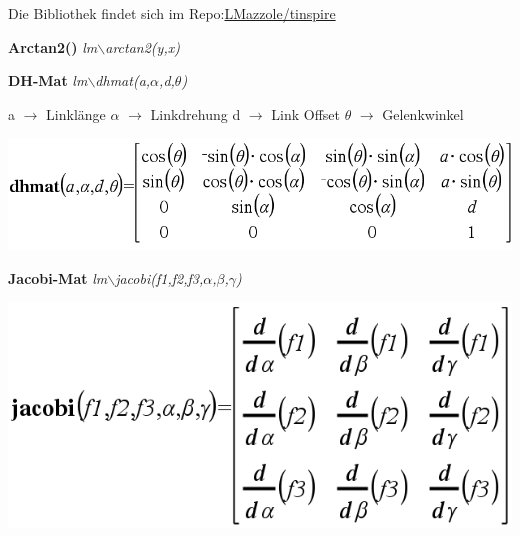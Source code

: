 \begin{minipage}{0.6\linewidth}
    \vspace{-1cm}
    Die Bibliothek findet sich im Repo:\newline \href{https://github.com/LMazzole/tinspire}{LMazzole/tinspire}
    
    \hrulefill
    
    \textbf{Arctan2()} \hfill \textit{lm$\backslash$arctan2(y,x)} \hspace{4.5cm}
    
    \hrulefill
    
    \textbf{DH-Mat}\hfill 
    \textit{lm$\backslash$dhmat(a,$\alpha$,d,$\theta$)} \hspace{4cm}
    \begin{multicols}{2}
        a $\rightarrow$ Linklänge \newline
        $\alpha$ $\rightarrow$ Linkdrehung\newline
        d $\rightarrow$ Link Offset\newline
        $\theta$ $\rightarrow$ Gelenkwinkel
    \end{multicols}
    \begin{center}
        \includegraphics[width=0.7\linewidth]{./bilder/dhmat}
    \end{center} \vspace{-\baselineskip}
    \hrulefill
    
    \textbf{Jacobi-Mat} \hfill \textit{lm$\backslash$jacobi(f1,f2,f3,$\alpha$,$\beta$,$\gamma$)}\hspace{3.8cm}
    
    \begin{center}
    \includegraphics[width=0.6\linewidth]{./bilder/jacobi}
    \end{center}   \vspace{-\baselineskip}
    \hrulefill
\end{minipage}
